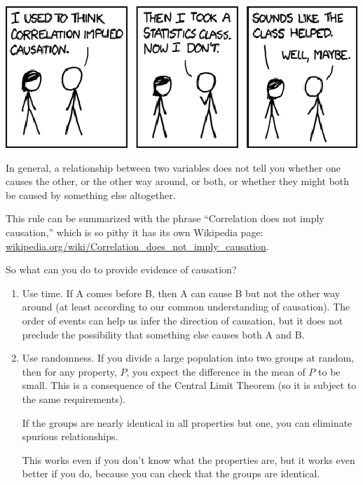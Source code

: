 \documentclass[12pt]{book}
\begin{document}
\vspace{0.1in}
\centerline{\includegraphics{figs/correlation.eps}}

In general, a relationship between two variables does not tell you
whether one causes the other, or the other way around, or both, or
whether they might both be caused by something else altogether.

This rule can be summarized with the phrase ``Correlation
does not imply causation,'' which is so pithy it has its own
Wikipedia page: \url{wikipedia.org/wiki/Correlation_does_not_imply_causation}.

So what can you do to provide evidence of causation?

\begin{enumerate}

\item Use time.  If A comes before B, then A can cause B but not the
  other way around (at least according to our common understanding of
  causation).  The order of events can help us infer the direction
  of causation, but it does not preclude the possibility that something
  else causes both A and B.

\item Use randomness.  If you divide a large population into two
  groups at random, then for any property, $P$, you expect the
  difference in the mean of $P$ to be small.  This is a consequence
  of the Central Limit Theorem (so it is subject to the same
  requirements).

  If the groups are nearly identical in all properties but one, you
  can eliminate spurious relationships.


  This works even if you don't know what the properties
  are, but it works even better if you do, because you can check that
  the groups are identical.

\end{enumerate}
\end{document}
